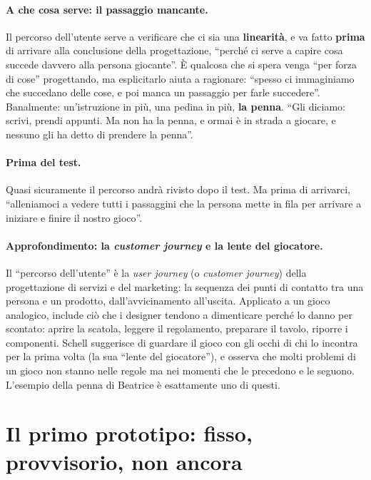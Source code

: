 \paragraph{A che cosa serve: il passaggio mancante.} Il percorso dell'utente serve a
verificare che ci sia una \textbf{linearità}, e va fatto \textbf{prima} di arrivare
alla conclusione della progettazione, ``perché ci serve a capire cosa succede davvero
alla persona giocante''. È qualcosa che si spera venga ``per forza di cose''
progettando, ma esplicitarlo aiuta a ragionare: ``spesso ci immaginiamo che succedano
delle cose, e poi manca un passaggio per farle succedere''. Banalmente: un'istruzione
in più, una pedina in più, \textbf{la penna}. ``Gli diciamo: scrivi, prendi appunti.
Ma non ha la penna, e ormai è in strada a giocare, e nessuno gli ha detto di prendere
la penna''.

\paragraph{Prima del test.} Quasi sicuramente il percorso andrà rivisto dopo il test.
Ma prima di arrivarci, ``alleniamoci a vedere tutti i passaggini che la persona mette
in fila per arrivare a iniziare e finire il nostro gioco''.

\paragraph{Approfondimento: la \emph{customer journey} e la lente del giocatore.}
Il ``percorso dell'utente'' è la \emph{user journey} (o \emph{customer journey})
della progettazione di servizi e del marketing: la sequenza dei punti di contatto tra
una persona e un prodotto, dall'avvicinamento all'uscita. Applicato a un gioco
analogico, include ciò che i designer tendono a dimenticare perché lo danno per
scontato: aprire la scatola, leggere il regolamento, preparare il tavolo, riporre i
componenti. Schell suggerisce di guardare il gioco con gli occhi di chi lo incontra
per la prima volta (la sua ``lente del giocatore''), e osserva che molti problemi di un
gioco non stanno nelle regole ma nei momenti che le precedono e le seguono.
L'esempio della penna di Beatrice è esattamente uno di questi.

\section{Il primo prototipo: fisso, provvisorio, non ancora}
\label{a9:sec:prototipo}


